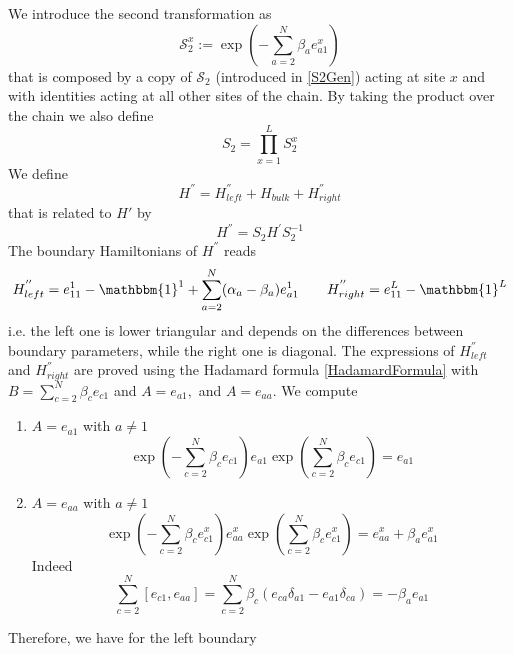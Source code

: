 \documentclass[11pt]{article}
\numberwithin{equation}{section}
\numberwithin{equation}{subsection}
\begin{document}
We introduce the second transformation as 
 \begin{equation}
 	\mathcal{S}_{2}^{x}:=\exp{\left(-\sum_{a=2}^{N}\beta_{a}e_{a1}^{x}\right)}%
 \end{equation}
that is composed by a copy of $\mathcal{S}_{2}$ (introduced in \eqref{S2Gen}) acting at site $x$ and with identities acting at all other sites of the chain. 
By taking the product over the chain we also define
\begin{equation}
	S_{2}=\prod_{x=1}^{L}S_{2}^{x}
\end{equation}
We define 
\begin{equation}\label{HSecond}
	H^{''}=H_{left}^{''}+H_{bulk}+H_{right}^{''}
\end{equation}
that is related to $H'$ by
\begin{equation}
	H^{''}=S_{2}H^{'}S_{2}^{-1}
\end{equation}
The boundary Hamiltonians of $H^{''}$ reads
\begin{align}
	H_{left}^{''}=e_{11}^{1}-\mathbbm{1}^{1}+\sum_{a=2}^{N}(\alpha_{a}-\beta_{a})e_{a1}^{1}\qquad H_{right}^{''}=e_{11}^{L}-\mathbbm{1}^{L}
\end{align}
i.e. the left one is lower triangular and depends on the differences between boundary parameters, while the right one is diagonal. The expressions of $H_{left}^{''}$ and $H_{right}^{''}$ are proved using the Hadamard formula \eqref{HadamardFormula} with $B=\sum_{c=2}^{N}\beta_{c}e_{c1}$ and $A=e_{a1},$ and $A=e_{aa}$. We compute
\begin{enumerate}
	\item $A=e_{a1}$ with $a\neq 1$
	\begin{equation}
		\exp{\left(-\sum_{c=2}^{N}\beta_{c}e_{c1}\right)}e_{a1}\exp{\left(\sum_{c=2}^{N}\beta_{c}e_{c1}\right)}=e_{a1}
	\end{equation}
\item $A=e_{aa}$ with $a\neq 1$
\begin{equation}
		\exp{\left(-\sum_{c=2}^{N}\beta_{c}e_{c1}^{x}\right)}e_{aa}^{x}\exp{\left(\sum_{c=2}^{N}\beta_{c}e_{c1}^{x}\right)}=e_{aa}^{x}+\beta_{a}e_{a1}^{x}
	\end{equation}
Indeed 
\begin{equation}
	\sum_{c=2}^{N}[e_{c1},e_{aa}]=\sum_{c=2}^{N}\beta_{c}\left(e_{ca}\delta_{a1}-e_{a1}\delta_{ca}\right)=-\beta_{a}e_{a1}
\end{equation}
\end{enumerate}
Therefore, we have for the left boundary
\end{document}
